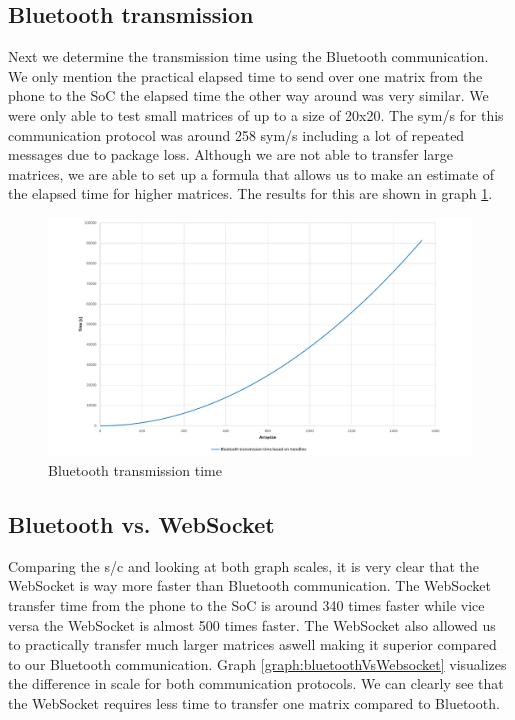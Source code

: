 \documentclass[a4paper, 11pt]{report}
\begin{document}
\subsection{Bluetooth transmission}
Next we determine the transmission time using the Bluetooth communication. We only mention the practical elapsed time to send over one matrix from the phone to the SoC the elapsed time the other way around was very similar. We were only able to test small matrices of up to a size of 20x20. The sym/s for this communication protocol was around 258 sym/s including a lot of repeated messages due to package loss. Although we are not able to transfer large matrices, we are able to set up a formula that allows us to make an estimate of the elapsed time for higher matrices. The results for this are shown in graph \ref{graph:bluetoothTime}.

\begin{figure}[ht]
\centering
\includegraphics[scale=0.45]{images/BluetoothtransmissionSpeed.pdf}
\caption{Bluetooth transmission time}\label{graph:bluetoothTime}
\end{figure}

\subsection{Bluetooth vs. WebSocket}
Comparing the s/c and looking at both graph scales, it is very clear that the WebSocket is way more faster than Bluetooth communication. The WebSocket transfer time from the phone to the SoC is around 340 times faster while vice versa the WebSocket is almost 500 times faster. The WebSocket also allowed us to practically transfer much larger matrices aswell making it superior compared to our Bluetooth communication. Graph \ref{graph:bluetoothVsWebsocket} visualizes the difference in scale for both communication protocols. We can clearly see that the WebSocket requires less time to transfer one matrix compared to Bluetooth.
\end{document}
